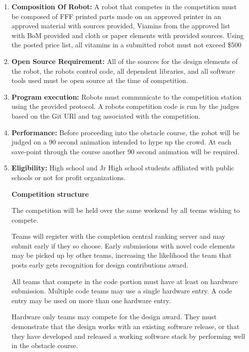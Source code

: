 \documentclass{article}
\begin{document}
\begin{enumerate}
	
\item \textbf{Composition Of Robot:} A robot that competes in the competition must be composed of FFF printed parts made on an approved printer in an approved material with sources provided, Viamins from the approved list with BoM provided and cloth or paper elements with provided sources. Using the posted price list, all vitamins in a submitted robot must not exceed \$500

\item \textbf{Open Source Requirement:} All of the sources for the design elements of the robot, the robots control code, all dependent libraries, and all software tools used must be open source at the time of competition. 

\item \textbf{Program execution:} Robots must communicate to the competition station using the provided protocol. A robots competition code is run by the judges based on the Git URl and tag associated with the competition. 


\item \textbf{Performance:} Before proceeding into the obstacle course, the robot will be judged on a 90 second animation intended to hype up the crowd. At each save-point through the course another 90 second animation will be required. 

\item \textbf{Eligibility:} High school and Jr High school students affiliated with public schools or not for profit organizations. 

 \pagebreak

{\huge \textbf{Competition structure}}

The competition will be held over the same weekend by all teems wishing to compete. 

Teams will register with the completion central ranking server and may submit early if they so choose. Early submissions with novel code elements may be picked up by other teams, increasing the likelihood the team that posts early gets recognition for design contributions award.

All teams that compete in the code portion must have at least on hardware submission. Multiple code teams may use a single hardware entry. A code entry may be used on more than one hardware entry. 

Hardware only teams may compete for the design award. They must demonstrate that the design works with an existing software release, or that they have developed and released a working software stack by performing well in the obstacle course. 


\end{enumerate}
\end{document}
